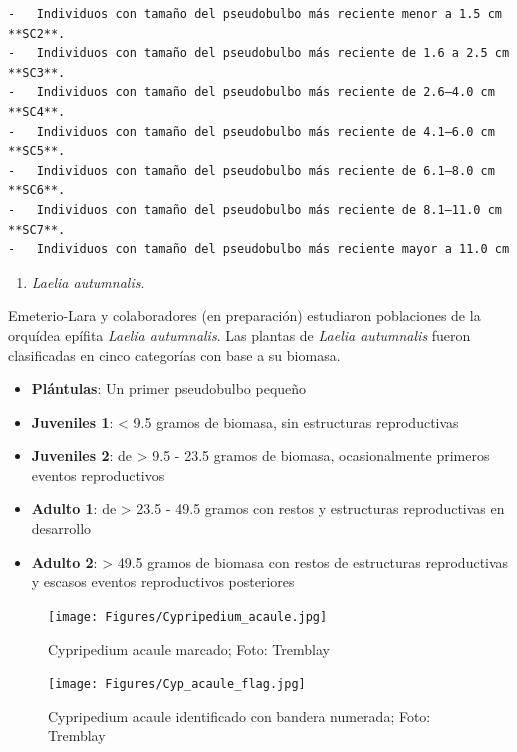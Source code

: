 \documentclass[
]{book}
\providecommand{\tightlist}{%
  \setlength{\itemsep}{0pt}\setlength{\parskip}{0pt}}
\theoremstyle{definition}
\theoremstyle{definition}
\theoremstyle{definition}
\theoremstyle{definition}
\theoremstyle{remark}
\begin{document}
\begin{verbatim}
-   Individuos con tamaño del pseudobulbo más reciente menor a 1.5 cm **SC2**.
-   Individuos con tamaño del pseudobulbo más reciente de 1.6 a 2.5 cm **SC3**.
-   Individuos con tamaño del pseudobulbo más reciente de 2.6–4.0 cm **SC4**.
-   Individuos con tamaño del pseudobulbo más reciente de 4.1–6.0 cm **SC5**.
-   Individuos con tamaño del pseudobulbo más reciente de 6.1–8.0 cm **SC6**.
-   Individuos con tamaño del pseudobulbo más reciente de 8.1–11.0 cm **SC7**.
-   Individuos con tamaño del pseudobulbo más reciente mayor a 11.0 cm
\end{verbatim}

\begin{enumerate}
\def\labelenumi{\roman{enumi})}
\tightlist
\item
  \emph{Laelia autumnalis}.
\end{enumerate}

Emeterio-Lara y colaboradores (en preparación) estudiaron poblaciones de la orquídea epífita \emph{Laelia autumnalis}.
Las plantas de \emph{Laelia autumnalis} fueron clasificadas en cinco categorías con base a su biomasa.

\begin{itemize}
\tightlist
\item
  \textbf{Plántulas}: Un primer pseudobulbo pequeño
\item
  \textbf{Juveniles 1}: \textless{} 9.5 gramos de biomasa, sin estructuras reproductivas
\item
  \textbf{Juveniles 2}: de \textgreater{} 9.5 - 23.5 gramos de biomasa, ocasionalmente primeros eventos reproductivos
\item
  \textbf{Adulto 1}: de \textgreater{} 23.5 - 49.5 gramos con restos y estructuras reproductivas en desarrollo
\item
  \textbf{Adulto 2}: \textgreater{} 49.5 gramos de biomasa con restos de estructuras reproductivas y escasos eventos reproductivos posteriores
\end{itemize}

\begin{figure}
\centering
\texttt{[image: Figures/Cypripedium\_acaule.jpg]}
\caption{Cypripedium acaule marcado; Foto: Tremblay}
\end{figure}

\begin{figure}
\centering
\texttt{[image: Figures/Cyp\_acaule\_flag.jpg]}
\caption{Cypripedium acaule identificado con bandera numerada; Foto: Tremblay}
\end{figure}
\end{document}
